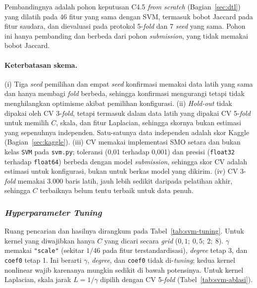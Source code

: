 Pembandingnya adalah pohon keputusan C4.5 \textit{from scratch} (Bagian~\ref{sec:dtl}) yang dilatih pada 46 fitur yang sama dengan SVM, termasuk bobot Jaccard pada fitur saudara, dan dievaluasi pada protokol 5-\textit{fold} dan 7 \textit{seed} yang sama. Pohon ini hanya pembanding dan berbeda dari pohon \textit{submission}, yang tidak memakai bobot Jaccard.

\paragraph{Keterbatasan skema.} (i) Tiga \textit{seed} pemilihan dan empat \textit{seed} konfirmasi memakai data latih yang sama dan hanya membagi \textit{fold} berbeda, sehingga konfirmasi mengurangi tetapi tidak menghilangkan optimisme akibat pemilihan konfigurasi. (ii) \textit{Hold-out} tidak dipakai oleh CV 3-\textit{fold}, tetapi termasuk dalam data latih yang dipakai CV 5-\textit{fold} untuk memilih $C$, skala, dan fitur Laplacian, sehingga skornya bukan estimasi yang sepenuhnya independen. Satu-satunya data independen adalah skor Kaggle (Bagian~\ref{sec:kaggle}). (iii) CV memakai implementasi SMO setara dan bukan kelas \texttt{SVM} pada \texttt{svm.py}; toleransi (0,01 terhadap 0,001) dan presisi (\texttt{float32} terhadap \texttt{float64}) berbeda dengan model \textit{submission}, sehingga skor CV adalah estimasi untuk konfigurasi, bukan untuk berkas model yang dikirim. (iv) CV 3-\textit{fold} memakai 3.000 baris latih, jauh lebih sedikit daripada pelatihan akhir, sehingga $C$ terbaiknya belum tentu terbaik untuk data penuh.

\subsubsection{\textit{Hyperparameter Tuning}}
Ruang pencarian dan hasilnya dirangkum pada Tabel~\ref{tab:svm-tuning}. Untuk kernel yang diwajibkan hanya $C$ yang dicari secara \textit{grid} ($0{,}1;\ 0{,}5;\ 2;\ 8$). $\gamma$ memakai \texttt{"scale"} (sekitar $1/46$ pada fitur terstandardisasi), \textit{degree} tetap 3, dan \texttt{coef0} tetap 1. Ini berarti $\gamma$, \textit{degree}, dan \texttt{coef0} tidak di-\textit{tuning}; kedua kernel nonlinear wajib karenanya mungkin sedikit di bawah potensinya. Untuk kernel Laplacian, skala jarak $L = 1/\gamma$ dipilih dengan CV 5-\textit{fold} (Tabel~\ref{tab:svm-ablasi}).

